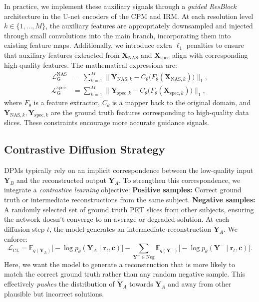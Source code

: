 \documentclass[
reprint,
superscriptaddress,
nofootinbib,
amsmath,amssymb,
aps,
prd,
]{revtex4-2}
\begin{document}
In practice, we implement these auxiliary signals through a \emph{guided ResBlock} architecture\cite{Ren2022} in the U-net encoders of the CPM and IRM. At each resolution level \(k\in\{1,\dots,M\}\), the auxiliary features are appropriately downsampled and injected through small convolutions into the main branch, incorporating them into existing feature maps. Additionally, we introduce extra \(\ell_1\) penalties to ensure that auxiliary features extracted from \(\mathbf{X}_{\text{NAS}}\) and \(\mathbf{X}_{\text{spec}}\) align with corresponding high-quality features. The mathematical expressions are:
\begin{align}
\mathcal{L}^\text{NAS}_{\text{G}} &= \sum_{k=1}^M \Big\|\mathbf{Y}_{\text{NAS},k} - C_\theta\big(F_\theta(\mathbf{X}_{\text{NAS},k})\big)\Big\|_1,\\
\mathcal{L}^\text{spec}_{\text{G}} &= \sum_{k=1}^M \Big\|\mathbf{Y}_{\text{spec},k} - C_\theta\big(F_\theta(\mathbf{X}_{\text{spec},k})\big)\Big\|_1,
\end{align}
where \(F_\theta\) is a feature extractor, \(C_\theta\) is a mapper back to the original domain, and \(\mathbf{Y}_{\text{NAS},k},\mathbf{Y}_{\text{spec},k}\) are the ground truth features corresponding to high-quality data slices. These constraints encourage more accurate guidance signals.

\subsection{Contrastive Diffusion Strategy}
\label{sec:contrastive_diff}
DPMs typically rely on an implicit correspondence between the low-quality input \(\mathbf{Y}_B\) and the reconstructed output \(\mathbf{Y}_A\). To strengthen this correspondence, we integrate a \emph{contrastive learning} objective:
\textbf{Positive samples:} Correct ground truth or intermediate reconstructions from the same subject.
\textbf{Negative samples:} A randomly selected set of ground truth PET slices from other subjects, ensuring the network doesn't converge to an average or degraded solution.
At each diffusion step \(t\), the model generates an intermediate reconstruction \(\widetilde{\mathbf{Y}}_A\). We enforce:
\begin{equation}
\mathcal{L}_{\text{CL}} = \mathbb{E}_{q(\mathbf{Y}_A)}\big[-\log p_\theta(\mathbf{Y}_A\mid \mathbf{r}_t,\mathbf{c})\big] 
- \sum_{\mathbf{Y}^- \in \text{Neg}}\mathbb{E}_{q(\mathbf{Y}^-)}\big[-\log p_\theta(\mathbf{Y}^-\mid \mathbf{r}_t,\mathbf{c})\big].
\end{equation}
Here, we want the model to generate a reconstruction that is more likely to match the correct ground truth rather than any random negative sample. This effectively \emph{pushes} the distribution of \(\widetilde{\mathbf{Y}}_A\) towards \(\mathbf{Y}_A\) and away from other plausible but incorrect solutions.
\end{document}
